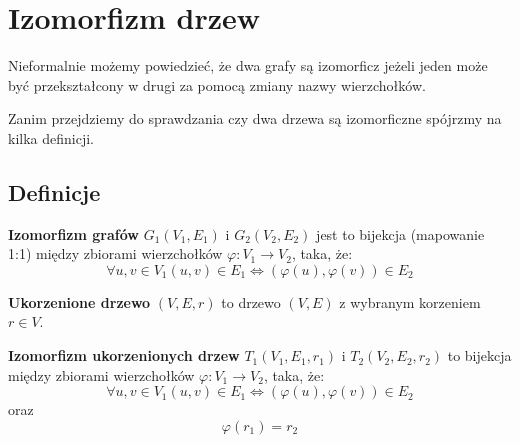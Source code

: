 \section{Izomorfizm drzew}

Nieformalnie możemy powiedzieć, że dwa grafy są izomorficz jeżeli jeden może być przekształcony w drugi za pomocą zmiany nazwy wierzchołków.

Zanim przejdziemy do sprawdzania czy dwa drzewa są izomorficzne spójrzmy na kilka definicji.

\subsection{Definicje}

\begin{definition}

    \textbf{Izomorfizm grafów} $G_1(V_1, E_1)$ i $G_2(V_2, E_2)$ jest to bijekcja (mapowanie 1:1) między zbiorami wierzchołków $\varphi
    : V_1 \rightarrow V_2$, taka, że:
$$ \forall u, v \in V_1 (u, v) \in E_1 \iff (\varphi(u),\varphi(v)) \in E_2 $$


\end{definition}

\begin{definition}

    \textbf{Ukorzenione drzewo} $(V, E, r)$ to drzewo $(V, E)$ z wybranym korzeniem $r \in V$.

\end{definition}

\begin{definition}
    \textbf{Izomorfizm ukorzenionych drzew} $T_1(V_1, E_1, r_1)$ i $T_2(V_2, E_2, r_2)$ to bijekcja między zbiorami wierzchołków
    $\varphi : V_1 \rightarrow V_2$, taka, że:
    $$\forall u, v \in V_1 (u, v) \in E_1 \iff (\varphi(u),\varphi(v)) \in E_2 $$
    oraz
    $$\varphi(r_1) = r_2$$
\end{definition}

